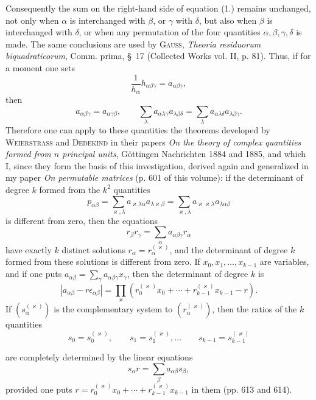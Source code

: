 \documentclass[11pt]{article}
\begin{document}
Consequently the sum on the right-hand side of equation (1.) remains unchanged, not only when $\alpha$ is interchanged with $\beta$, or $\gamma$ with $\delta$, but also when $\beta$ is interchanged with $\delta$, or when any permutation of the four quantities $\alpha,\beta,\gamma,\delta$ is made. The same conclusions are used by \textsc{Gauss}, \emph{Theoria residuorum biquadraticorum}, Comm. prima, \S~17 (Collected Works vol. II, p. 81). Thus, if for a moment one sets
\[
\frac{1}{h_\alpha}h_{\alpha\beta\gamma}=a_{\alpha\beta\gamma},
\]
then
\begin{equation*}\tag{3.}
a_{\alpha\beta\gamma}=a_{\alpha\gamma\beta},\qquad
\sum_\lambda a_{\alpha\lambda\gamma}a_{\lambda\beta\delta}=\sum_\lambda a_{\alpha\lambda\delta}a_{\lambda\beta\gamma}.
\end{equation*}
Therefore one can apply to these quantities the theorems developed by \textsc{Weierstrass} and \textsc{Dedekind} in their papers \emph{On the theory of complex quantities formed from $n$ principal units}, Göttingen Nachrichten 1884 and 1885, and which I, since they form the basis of this investigation, derived again and generalized in my paper \emph{On permutable matrices} (p. 601 of this volume): if the determinant of degree $k$ formed from the $k^2$ quantities
\[
p_{\alpha\beta}=\sum_{\varkappa,\lambda}a_{\varkappa\lambda\alpha}a_{\lambda\varkappa\beta}=\sum_{\varkappa,\lambda}a_{\varkappa\varkappa\lambda}a_{\lambda\alpha\beta}
\]
is different from zero, then the equations
\[
r_\beta r_\gamma=\sum_\alpha a_{\alpha\beta\gamma}r_\alpha
\]
have exactly $k$ distinct solutions $r_\alpha=r_\alpha^{(\varkappa)}$, and the determinant of degree $k$ formed from these solutions is different from zero. If $x_0,x_1,\ldots,x_{k-1}$ are variables, and if one puts $a_{\alpha\beta}=\sum_\gamma a_{\alpha\beta\gamma}x_\gamma$, then the determinant of degree $k$ is
\[
\left|a_{\alpha\beta}-r\epsilon_{\alpha\beta}\right|=\prod_\varkappa\left(r_0^{(\varkappa)}x_0+\cdots+r_{k-1}^{(\varkappa)}x_{k-1}-r\right).
\]
If $(s_\alpha^{(\varkappa)})$ is the complementary system to $(r_\alpha^{(\varkappa)})$, then the ratios of the $k$ quantities
\[
s_0=s_0^{(\varkappa)},\qquad s_1=s_1^{(\varkappa)},\ldots\qquad s_{k-1}=s_{k-1}^{(\varkappa)}
\]


are completely determined by the linear equations
\[
s_\alpha r=\sum_\beta a_{\alpha\beta}s_\beta,
\]
provided one puts $r=r_0^{(\varkappa)}x_0+\cdots+r_{k-1}^{(\varkappa)}x_{k-1}$ in them (pp. 613 and 614).
\end{document}
